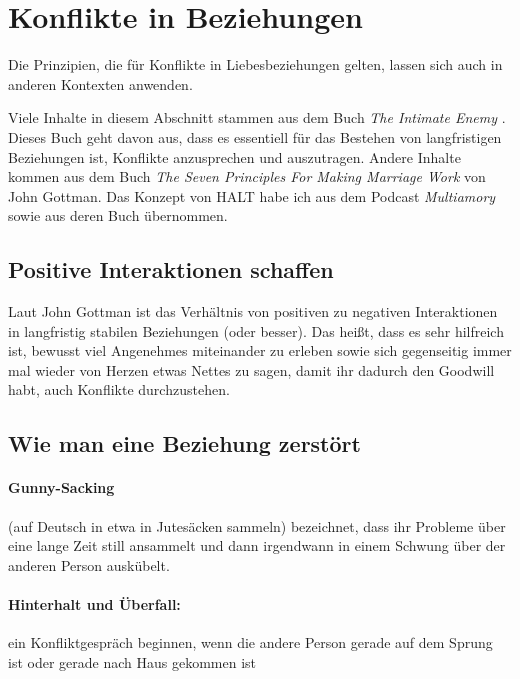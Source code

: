 \section{Konflikte in Beziehungen}
\label{konflikte-in-beziehungen}

Die Prinzipien, die für Konflikte in Liebesbeziehungen gelten, lassen sich auch in anderen Kontexten anwenden.

Viele Inhalte in diesem Abschnitt stammen aus dem Buch \emph{The Intimate Enemy} \cite{intimate-enemy}. Dieses Buch geht davon aus, dass es essentiell für das Bestehen von langfristigen Beziehungen ist, Konflikte anzusprechen und auszutragen. Andere Inhalte kommen aus dem Buch \emph{The Seven Principles For Making Marriage Work} \cite{gottman-7-principles} von John Gottman. Das Konzept von HALT habe ich aus dem Podcast \emph{Multiamory} \cite{halt-multiamory} sowie aus deren Buch \cite{multiamory-book} übernommen.


\subsection{Positive Interaktionen schaffen}

Laut John Gottman ist das Verhältnis von positiven zu negativen Interaktionen in langfristig stabilen Beziehungen  (oder besser). Das heißt, dass es sehr hilfreich ist, bewusst viel Angenehmes miteinander zu erleben sowie sich gegenseitig immer mal wieder von Herzen etwas Nettes zu sagen, damit ihr dadurch den Goodwill habt, auch Konflikte durchzustehen.


\subsection{Wie man eine Beziehung zerstört}

\paragraph{Gunny-Sacking} (auf Deutsch in etwa \glqq in Jutesäcken sammeln\grqq) bezeichnet, dass ihr Probleme über eine lange Zeit still ansammelt und dann irgendwann in einem Schwung über der anderen Person auskübelt.

\paragraph{Hinterhalt und Überfall:} ein Konfliktgespräch beginnen, wenn die andere Person gerade auf dem Sprung ist oder gerade nach Haus gekommen ist

